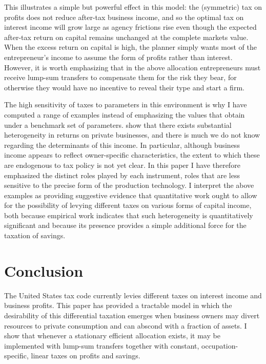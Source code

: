 \documentclass[11pt]{article}
\theoremstyle{plain}
\theoremstyle{definition} %
\begin{document}
This illustrates a simple but powerful effect in this model: the (symmetric) tax on profits does not reduce after-tax business income, and so the optimal tax on interest income will grow large as agency frictions rise even though the expected after-tax return on capital remains unchanged at the complete markets value. When the excess return on capital is high, the planner simply wants most of the entrepreneur's income to assume the form of profits rather than interest. However, it is worth emphasizing that in the above allocation entrepreneurs must receive lump-sum transfers to compensate them for the risk they bear, for otherwise they would have no incentive to reveal their type and start a firm.  

The high sensitivity of taxes to parameters in this environment is why I have computed a range of examples instead of emphasizing the values that obtain under a benchmark set of parameters. \cite{smith_capitalists_2019} show that there exists substantial heterogeneity in returns on private businesses, and there is much we do not know regarding the determinants of this income. In particular, although business income appears to reflect owner-specific characteristics, the extent to which these are endogenous to tax policy is not yet clear. In this paper I have therefore emphasized the distinct roles played by each instrument, roles that are less sensitive to the precise form of the production technology. I interpret the above examples as providing suggestive evidence that quantitative work ought to allow for the possibility of levying different taxes on various forms of capital income, both because empirical work indicates that such heterogeneity is quantitatively significant and because its presence provides a simple additional force for the taxation of savings. 


\section{Conclusion} \label{conc}

The United States tax code currently levies different taxes on interest income and business profits. This paper has provided a tractable model in which the desirability of this differential taxation emerges when business owners may divert resources to private consumption and can abscond with a fraction of assets. I show that whenever a stationary efficient allocation exists, it may be implemented with lump-sum transfers together with constant, occupation-specific, linear taxes on profits and savings. 
\end{document}
